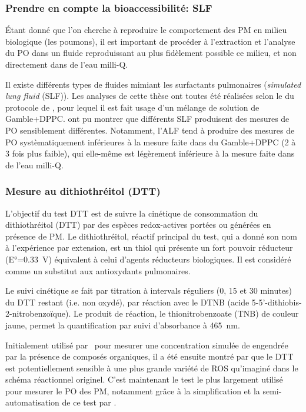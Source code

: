 \subsubsection{Prendre en compte la bioaccessibilité: SLF}%
\label{sub:prendre_en_compte_la_bioaccessibilite_slf}

Étant donné que l'on cherche à reproduire le comportement des PM en milieu biologique
(les poumons), il est important de procéder à l'extraction et l'analyse du PO dans un
fluide reproduissant au plus fidèlement possible ce milieu, et non directement dans de
l'eau milli-Q.

Il existe différents types de fluides mimiant les surfactants pulmonaires
(\textit{simulated lung fluid} (SLF)). Les analyses de cette thèse ont toutes été
réalisées selon le du protocole de \textcite{calasPollution2017}, pour lequel il est fait
usage d'un mélange de solution de Gamble+DPPC.  \textcite{calasImportance2017} ont pu
montrer que différents SLF produisent des mesures de PO sensiblement différentes.
Notamment, l'ALF tend à produire des mesures de PO systèmatiquement inférieures à la
mesure faite dans du Gamble+DPPC (2 à 3 fois plus faible), qui elle-même est légèrement
inférieure à la mesure faite dans de l'eau milli-Q.

\subsubsection{Mesure au dithiothréitol (DTT)}%
\label{ssub:mesure_au_dtt}

L’objectif du test DTT est de suivre la cinétique de consommation du dithiothréitol (DTT)
par des espèces redox-actives portées ou générées en présence de PM. Le dithiothréitol,
réactif principal du test, qui a donné son nom à l’expérience par extension, est un thiol
qui présente un fort pouvoir réducteur (E°=\SI{0.33}{\V}) équivalent à celui d’agents réducteurs
biologiques. Il est considéré comme un substitut aux antioxydants pulmonaires.

Le suivi cinétique se fait par titration à intervals réguliers (0, 15 et 30 minutes) du DTT
restant (i.e. non oxydé), par réaction avec le DTNB (acide
5-5'-dithiobis-2-nitrobenzoïque). Le produit de réaction, le thionitrobenzoate (TNB) de
couleur jaune, permet la quantification par suivi d'absorbance à \SI{465}{nm}.

Initialement utilisé par~\textcite{choRedox2005} pour mesurer une concentration simulée de
 engendrée par la présence de composés organiques, il a été ensuite montré par
\textcite{beiReaction2014} que le DTT est potentiellement sensible à une plus grande
variété de ROS qu'imaginé dans le schéma réactionnel originel. C'est maintenant le test le
plus largement utilisé pour mesurer le PO des PM, notamment grâce à la simplification et
la semi-automatisation de ce test par \textcite{fangSemiautomated2015}.

